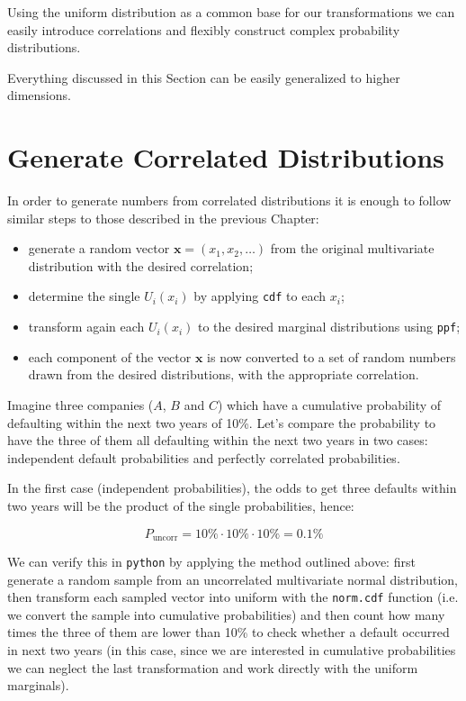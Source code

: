 Using the uniform distribution as a common base for our transformations we can easily introduce correlations and flexibly construct complex probability distributions. 

Everything discussed in this Section can be easily generalized to higher dimensions.

\section{Generate Correlated Distributions}
\label{generate-correlated-distributions}

In order to generate numbers from correlated distributions it is enough to follow similar steps to those described in the previous Chapter:

\begin{itemize}
\tightlist
\item
  generate a random vector \(\mathbf{x}=(x_1, x_2,\ldots)\) from the  original multivariate distribution with the desired correlation;
\item
  determine the single \(U_i(x_i)\) by applying \texttt{cdf} to each \(x_i\);
\item
  transform again each \(U_i(x_i)\) to the desired marginal distributions using \texttt{ppf};
\item
  each component of the vector \(\mathbf{x}\) is now converted to a set of random numbers drawn from the desired distributions, with the appropriate correlation.
\end{itemize}

Imagine three companies ($A$, $B$ and $C$) which have a cumulative probability of defaulting within the next two years of 10\%.
Let's compare the probability to have the three of them all defaulting within the next two years in two cases: independent default probabilities and perfectly correlated probabilities.

In the first case (independent probabilities), the odds to get three defaults within two years will be the product of the single probabilities, hence:

\[P_{\mathrm{uncorr}} = 10\% \cdot 10\% \cdot 10\% = 0.1 \%\]

We can verify this in \texttt{python} by applying the method outlined above: first generate a random sample from an uncorrelated multivariate normal distribution, then transform each sampled vector into uniform with the \texttt{norm.cdf} function (i.e. we convert the sample into cumulative probabilities) and then count how many times the three of them are lower than 10\% to check whether a default occurred in next two years (in this case, since we are interested in cumulative probabilities we can neglect the last transformation and work directly with the uniform marginals).

